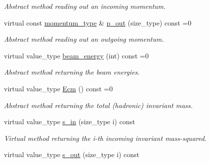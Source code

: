 \begin{DoxyCompactItemize}
\begin{DoxyCompactList}\small\item\em Abstract method reading out an incoming momentum. \end{DoxyCompactList}\item 
\hypertarget{a00442_aecdc8567f2e5cd0f2e7a7660f2a06722}{virtual const \hyperlink{a00559}{momentum\-\_\-type} \& \hyperlink{a00442_aecdc8567f2e5cd0f2e7a7660f2a06722}{p\-\_\-out} (size\-\_\-type) const =0}\label{a00442_aecdc8567f2e5cd0f2e7a7660f2a06722}

\begin{DoxyCompactList}\small\item\em Abstract method reading out an outgoing momentum. \end{DoxyCompactList}\item 
\hypertarget{a00442_aa5b9b0753a4f607517c5fcf26d82c921}{virtual value\-\_\-type \hyperlink{a00442_aa5b9b0753a4f607517c5fcf26d82c921}{beam\-\_\-energy} (int) const =0}\label{a00442_aa5b9b0753a4f607517c5fcf26d82c921}

\begin{DoxyCompactList}\small\item\em Abstract method returning the beam energies. \end{DoxyCompactList}\item 
\hypertarget{a00442_ac7c94ec848706882d18ee5983ee6c205}{virtual value\-\_\-type \hyperlink{a00442_ac7c94ec848706882d18ee5983ee6c205}{Ecm} () const =0}\label{a00442_ac7c94ec848706882d18ee5983ee6c205}

\begin{DoxyCompactList}\small\item\em Abstract method returning the total (hadronic) invariant mass. \end{DoxyCompactList}\item 
\hypertarget{a00442_aeb270d6a68cd7d9157848609250c652c}{virtual value\-\_\-type \hyperlink{a00442_aeb270d6a68cd7d9157848609250c652c}{s\-\_\-in} (size\-\_\-type i) const }\label{a00442_aeb270d6a68cd7d9157848609250c652c}

\begin{DoxyCompactList}\small\item\em Virtual method returning the i-\/th incoming invariant mass-\/squared. \end{DoxyCompactList}\item 
\hypertarget{a00442_ade1e4b8ea51198e20b2c987c8865a649}{virtual value\-\_\-type \hyperlink{a00442_ade1e4b8ea51198e20b2c987c8865a649}{s\-\_\-out} (size\-\_\-type i) const }\label{a00442_ade1e4b8ea51198e20b2c987c8865a649}


\end{DoxyCompactItemize}

